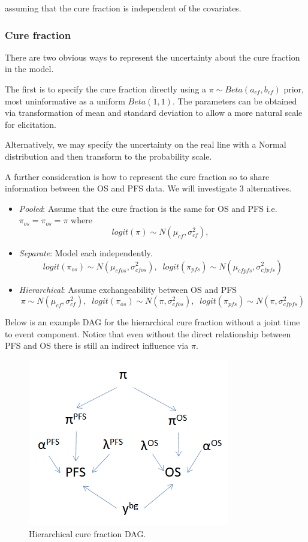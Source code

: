 \documentclass[
]{article}
\providecommand{\tightlist}{%
  \setlength{\itemsep}{0pt}\setlength{\parskip}{0pt}}
\begin{document}
assuming that the cure fraction is independent of the covariates.

\hypertarget{cure-fraction}{%
\subsubsection{Cure fraction}\label{cure-fraction}}

There are two obvious ways to represent the uncertainty about the cure
fraction in the model.

The first is to specify the cure fraction directly using a
\(\pi \sim Beta(a_{cf}, b_{cf})\) prior, most uninformative as a uniform
\(Beta(1,1)\). The parameters can be obtained via transformation of mean
and standard deviation to allow a more natural scale for elicitation.

Alternatively, we may specify the uncertainty on the real line with a
Normal distribution and then transform to the probability scale.

A further consideration is how to represent the cure fraction so to
share information between the OS and PFS data. We will investigate 3
alternatives.

\begin{itemize}
\tightlist
\item
  \emph{Pooled}: Assume that the cure fraction is the same for OS and
  PFS i.e.~\(\pi_{os} = \pi_{os} = \pi\) where \[
  logit(\pi) \sim N(\mu_{cf}, \sigma_{cf}^2), \;\;
  \]
\item
  \emph{Separate}: Model each independently. \[
  logit(\pi_{os}) \sim N(\mu_{cfos}, \sigma_{cfos}^2), \;\;  
  logit(\pi_{pfs}) \sim N(\mu_{cfpfs}, \sigma_{cfpfs}^2)  
  \]
\item
  \emph{Hierarchical}: Assume exchangeability between OS and PFS\[
  \pi \sim N(\mu_{cf}, \sigma_{cf}^2), \;\;  
  logit(\pi_{os}) \sim N(\pi, \sigma_{cfos}^2), \;\;  
  logit(\pi_{pfs}) \sim N(\pi, \sigma_{cfpfs}^2)  
  \]
\end{itemize}

Below is an example DAG for the hierarchical cure fraction without a
joint time to event component. Notice that even without the direct
relationship between PFS and OS there is still an indirect influence via
\(\pi\).

\begin{figure}

{\centering \includegraphics[width=0.4\linewidth]{hierarchical_DAG} 

}

\caption{\label{fig:hier_dag} Hierarchical cure fraction DAG.}\label{fig:unnamed-chunk-2}
\end{figure}
\end{document}

